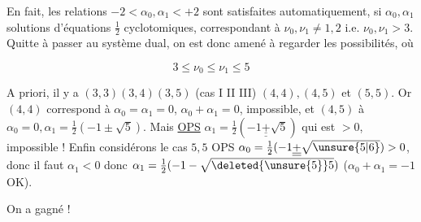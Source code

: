 En fait, les relations $-2<\alpha_0,\alpha_1<+2$ sont satisfaites automatiquement, si $\alpha_0,\alpha_1$ solutions d'équations $\tfrac12$ cyclotomiques, correspondant à $\nu_0,\nu_1\ne1,2$ i.e. $\nu_0,\nu_1>3$. Quitte à passer au système dual, on est donc amené à regarder les possibilités, où

\[
 3\leq\nu_0\leq\nu_1\leq5
\]

A priori, il y a  $(3,3)(3,4)(3,5)$ (cas I II III) $(4,4),(4,5)$ et $(5,5)$. Or $(4,4)$ correspond à  $\alpha_0=\alpha_1=0$, $\alpha_0+\alpha_1=0$, impossible, et $(4,5)$ à $\alpha_0=0,\alpha_1=\tfrac12(-1\pm\sqrt5)$. Mais \uline{OPS} $\alpha_1=\tfrac12(-1\underline{\underline{+}}\sqrt5)$ qui est $>0$,  impossible ! Enfin considérons le cas $5,5$ OPS $\alpha_0=\tfrac12(-1\underline{\underline{+}}\sqrt{\unsure{5|6}})>0$, donc il faut $\alpha_1<0$ donc $\alpha_{1}=\tfrac12(-1-\sqrt{\deleted{\unsure{5}}5})$ ($\alpha_0+\alpha_1=-1$ OK).

On a gagné !
